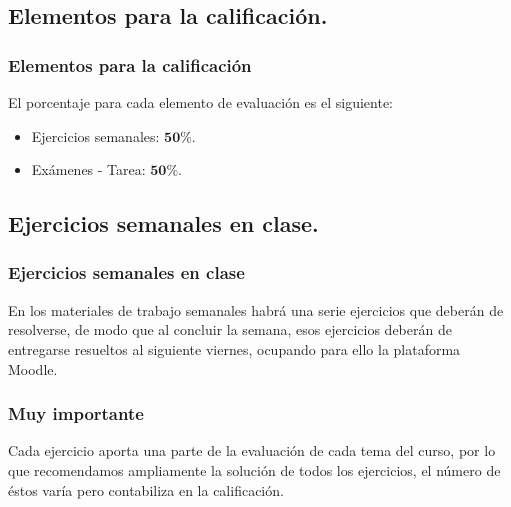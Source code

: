 \subsection{Elementos para la calificación.}
\begin{frame}
\frametitle{Elementos para la calificación}
El porcentaje para cada elemento de evaluación es el siguiente:
\begin{itemize}
\setlength{\itemsep}{0mm}
\item Ejercicios semanales: $\mathbf{50\%}$.
\item Exámenes - Tarea: $\mathbf{50\%}$.
\end{itemize}
\end{frame}

\subsection{Ejercicios semanales en clase.}

\begin{frame}
\frametitle{Ejercicios semanales en clase}
En los materiales de trabajo semanales habrá una serie ejercicios que deberán de resolverse, de modo que al concluir la semana, esos ejercicios deberán de entregarse resueltos al siguiente viernes, ocupando para ello la plataforma Moodle.
\end{frame}
\begin{frame}
\frametitle{Muy importante}
Cada ejercicio aporta una parte de la evaluación de cada tema del curso, por lo que recomendamos ampliamente la solución de todos los ejercicios, el número de éstos varía pero contabiliza en la calificación.
\end{frame}
